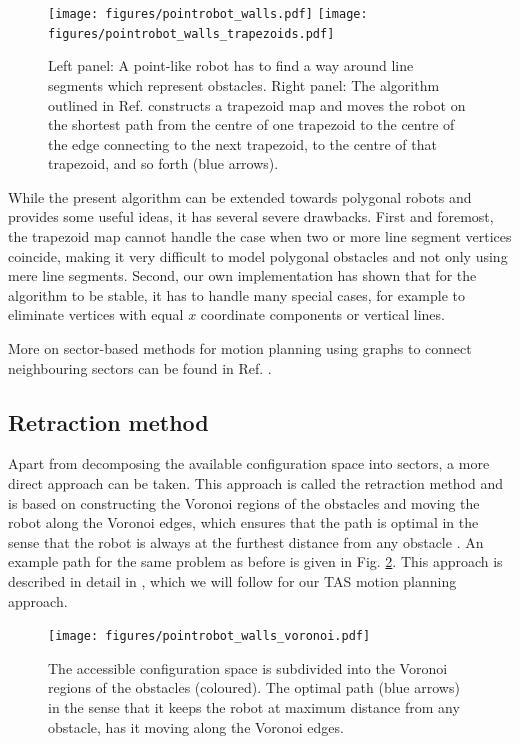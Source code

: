 \begin{figure}[htb]
	\centering
	\texttt{[image: figures/pointrobot\_walls.pdf]}
	\hspace{1 cm}
	\texttt{[image: figures/pointrobot\_walls\_trapezoids.pdf]}
	\caption[Pathfinding using trapezoid maps.]{
		Left panel: A point-like robot has to find a way around line segments 
		which represent obstacles. 
		Right panel: The algorithm outlined in Ref. \cite[p. 289]{Berg2008} 
		constructs a trapezoid map and moves the robot on the shortest path from 
		the centre of one trapezoid to the centre of the edge connecting to the 
		next trapezoid, to the centre of that trapezoid, and so forth (blue arrows).}
	\label{fig:robot_trapezoids}
\end{figure}

While the present algorithm can be extended towards polygonal robots \cite[Ch. 13.3, pp. 290-297]{Berg2008} 
and provides some useful ideas, it has several severe drawbacks. First and 
foremost, the trapezoid map cannot handle the case when two or more line segment 
vertices coincide, making it very difficult to model polygonal obstacles and not 
only using mere line segments. Second, our own implementation has shown that for 
the algorithm to be stable, it has to handle many special cases, for example to 
eliminate vertices with equal $x$ coordinate components or vertical lines.

More on sector-based methods for motion planning using graphs to connect neighbouring
sectors can be found in Ref. \cite{Choset2010_ch6}.

\vspace{0.5cm}

\subsection{Retraction method}
Apart from decomposing the available configuration space into sectors, a more 
direct approach can be taken. 
This approach is called the retraction method and is based on constructing the 
Voronoi regions of the obstacles and moving the robot along the Voronoi edges, 
which ensures that the path is optimal in the sense that the robot is always at 
the furthest distance from any obstacle \cite[pp. 163 and 304]{Berg2008}.
An example path for the same problem as before is given in Fig. \ref{fig:robot_voronoi}.
This approach is described in detail in \cite[pp. 247-251]{FUH_geo2020}, which 
we will follow for our TAS motion planning approach.

\begin{figure}[htb]
	\centering
	\texttt{[image: figures/pointrobot\_walls\_voronoi.pdf]}
	\caption[Pathfinding using Voronoi diagrams.]{
		The accessible configuration space is subdivided into the Voronoi regions 
		of the obstacles (coloured). The optimal path (blue arrows) in the sense 
		that it keeps the robot at maximum distance from any obstacle, has it 
		moving along the Voronoi edges.}
	\label{fig:robot_voronoi}
\end{figure}



